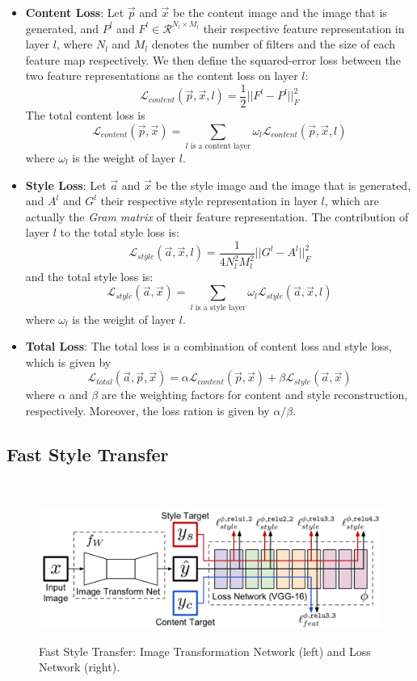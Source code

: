 \documentclass{article} %
\begin{document}
\begin{itemize}
\item \textbf{Content Loss}: Let $\vec{p}$ and $\vec{x}$ be the content image and the image that is generated, and $P^l$ and $F^l\in \mathcal{R}^{N_l\times M_l}$ their respective feature representation in layer $l$, where $N_l$ and $M_l$ denotes the number of filters and the size of each feature map respectively. We then define the squared-error loss between the two feature representations as the content loss on layer $l$:
$$\mathcal{L}_{content}(\vec{p}, \vec{x}, l)=\frac{1}{2}||F^l-P^l||_F^2$$
The total content loss is  $$\mathcal{L}_{content}(\vec{p},\vec{x})=\sum_{l \text{ is a content layer}}\omega_l\mathcal{L}_{content}(\vec{p},\vec{x},l)$$ where $\omega_l$ is the weight of layer $l$.
\item \textbf{Style Loss}: Let $\vec{a}$ and $\vec{x}$ be the style image and the image that is generated, and $A^l$ and $G^l$ their respective style representation in layer $l$, which are actually the \emph{Gram matrix} of their feature representation. The contribution of layer $l$ to the total style loss is:
$$\mathcal{L}_{style}(\vec{a}, \vec{x}, l)=\frac{1}{4N_l^2M_l^2}||G^l-A^l||_F^2$$
and the total style loss is:
$$\mathcal{L}_{style}(\vec{a},\vec{x})=\sum_{l \text{ is a style layer}}\omega_{l}\mathcal{L}_{style}(\vec{a}, \vec{x}, l)$$
where $\omega_l$ is the weight of layer $l$.
\item \textbf{Total Loss}: The total loss is a combination of content loss and style loss, which is given by $$\mathcal{L}_{total}(\vec{a},\vec{p},\vec{x})=\alpha \mathcal{L}_{content}(\vec{p},\vec{x}) + \beta \mathcal{L}_{style}(\vec{a},\vec{x})$$ where $\alpha$ and $\beta$ are the weighting factors for content and style reconstruction, respectively. Moreover, the loss ration is given by $\alpha/\beta$.
\end{itemize}



\subsection{Fast Style Transfer}
\cite{1406.2661}
\cite{1603.08155}\\
\begin{figure}[h]
\centering
\includegraphics[scale=0.3]{fast.png}
\label{fig: fast}
\caption{Fast Style Transfer: Image Transformation Network (left) and Loss Network (right).}
\end{figure}
\end{document}
